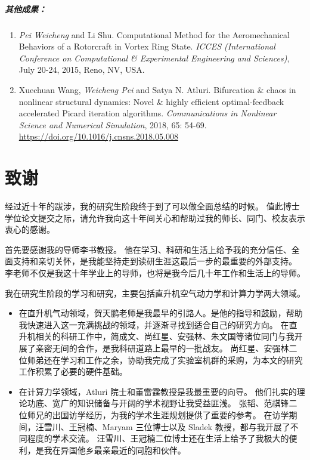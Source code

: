 \documentclass[doctor,openright,twoside,AutoFakeBold=true]{buaathesis}
\theoremstyle{plain}
\theoremstyle{definition}
\theoremstyle{plain}
\theoremstyle{plain}
\theoremstyle{remark}
\theoremstyle{remark}
\theoremstyle{definition}
\theoremstyle{plain}
\theoremstyle{definition}
\theoremstyle{plain}
\theoremstyle{plain}
\theoremstyle{remark}
\theoremstyle{plain}
\theoremstyle{definition}
\theoremstyle{remark}
\theoremstyle{plain}
\theoremstyle{remark}
\theoremstyle{definition}
\theoremstyle{plain}
\theoremstyle{plain}
\theoremstyle{definition}
\theoremstyle{plain}
\theoremstyle{plain}
\theoremstyle{definition}
\begin{document}
\paragraph*{其他成果：}
\begin{enumerate}
\item
\emph{Pei Weicheng} and Li Shu. Computational Method for the Aeromechanical Behaviors of a Rotorcraft in Vortex Ring State. \textit{ICCES (International Conference on Computational \& Experimental Engineering and Sciences)}, July 20-24, 2015, Reno, NV, USA.

\item
Xuechuan Wang, \emph{Weicheng Pei} and Satya N. Atluri. 
Bifurcation \& chaos in nonlinear structural dynamics: Novel \& highly efficient optimal-feedback accelerated Picard iteration algorithms. \textit{Communications in Nonlinear Science and Numerical Simulation}, 2018, 65: 54-69.
\url{https://doi.org/10.1016/j.cnsns.2018.05.008}
\end{enumerate}

\chapter{致谢}

经过近十年的跋涉，我的研究生阶段终于到了可以做全面总结的时候。
值此博士学位论文提交之际，请允许我向这十年间关心和帮助过我的师长、同门、校友表示衷心的感谢。

首先要感谢我的导师李书教授。
他在学习、科研和生活上给予我的充分信任、全面支持和亲切关怀，是我能坚持走到读研生涯这最后一步的最重要的外部支持。
李老师不仅是我这十年学业上的导师，也将是我今后几十年工作和生活上的导师。

我在研究生阶段的学习和研究，主要包括直升机空气动力学和计算力学两大领域。
\begin{itemize}[wide]
\item
在直升机气动领域，贺天鹏老师是我最早的引路人。是他的指导和鼓励，帮助我快速进入这一充满挑战的领域，并逐渐寻找到适合自己的研究方向。
在直升机相关的科研工作中，简成文、尚红星、安强林、朱文国等诸位同门与我开展了亲密无间的合作，是我科研道路上最早的一批战友。
尚红星、安强林二位师弟还在学习和工作之余，协助我完成了实验室机群的采购，为本文的研究工作积累了必要的硬件基础。
\item
在计算力学领域，Atluri 院士和董雷霆教授是我最重要的向导。
他们扎实的理论功底、宽广的知识储备与开阔的学术视野让我受益匪浅。
张韬、范祺锋二位师兄的出国访学经历，为我的学术生涯规划提供了重要的参考。
在访学期间，汪雪川、王冠楠、Maryam 三位博士以及 Sladek 教授，都与我开展了不同程度的学术交流。
汪雪川、王冠楠二位博士还在生活上给予了我极大的便利，是我在异国他乡最亲最近的同胞和伙伴。
\end{itemize}
\end{document}
